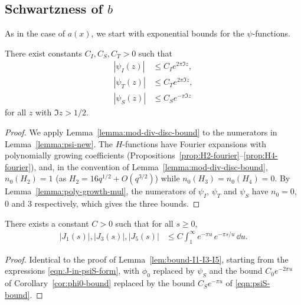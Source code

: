 \subsection{Schwartzness of $b$}

As in the case of $a(x)$, we start with exponential bounds for the $\psi$-functions.

\begin{lemma}\label{lemma:psi-bound}
    There exist constants $C_I, C_S, C_T > 0$ such that
    \begin{align}
        |\psi_I(z)| &\le C_I e^{2\pi \Im z}, \label{eqn:psiI-bound} \\
        |\psi_T(z)| &\le C_T e^{2\pi \Im z}, \label{eqn:psiT-bound} \\
        |\psi_S(z)| &\le C_S e^{- \pi \Im z} \label{eqn:psiS-bound}
    \end{align}
    for all $z$ with $\Im z > 1/2$.
\end{lemma}
\begin{proof}
    We apply Lemma~\ref{lemma:mod-div-disc-bound} to the numerators in Lemma~\ref{lemma:psi-new}. The $H$-functions have Fourier expansions with polynomially growing coefficients (Propositions~\ref{prop:H2-fourier}--\ref{prop:H4-fourier}), and, in the convention of Lemma~\ref{lemma:mod-div-disc-bound}, $n_0(H_2) = 1$ (as $H_2 = 16 q^{1/2} + O(q^{3/2})$) while $n_0(H_3) = n_0(H_4) = 0$. By Lemma~\ref{lemma:poly-growth-mul}, the numerators of $\psi_I$, $\psi_T$ and $\psi_S$ have $n_0 = 0$, $0$ and $3$ respectively, which gives the three bounds.
\end{proof}

\begin{lemma}\label{lemma:bound-J1-J3-J5}
There exists a constant $C > 0$ such that for all $s \geq 0$,
\begin{align}
    |J_1(s)|, |J_3(s)|, |J_5(s)| &\le C \int_1^{\infty} e^{-\pi u}\, e^{-\pi s / u}\, \dd u.
\end{align}
\end{lemma}
\begin{proof}
Identical to the proof of Lemma~\ref{lem:bound-I1-I3-I5}, starting from the expressions \eqref{eqn:J-in-psiS-form}, with $\phi_0$ replaced by $\psi_S$ and the bound $C_0 e^{-2\pi u}$ of Corollary~\ref{cor:phi0-bound} replaced by the bound $C_S e^{-\pi u}$ of \eqref{eqn:psiS-bound}.
\end{proof}


